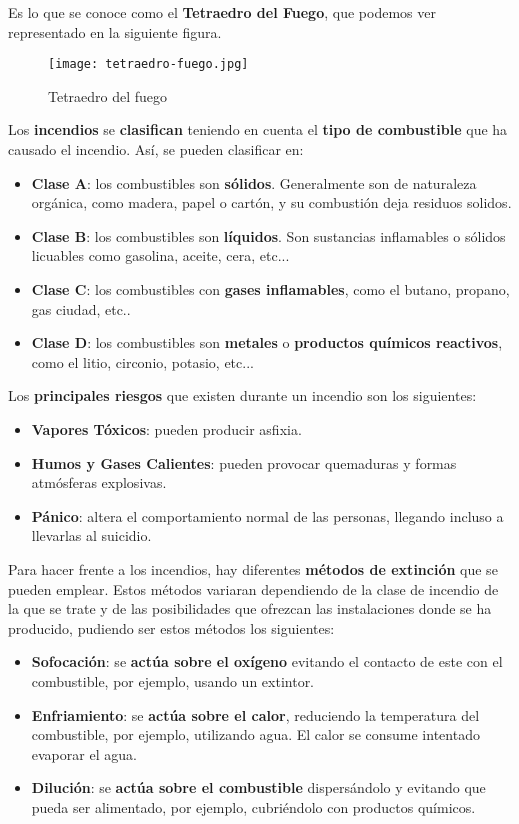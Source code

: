 Es lo que se conoce como el \textbf{Tetraedro del Fuego}, que podemos ver representado en la siguiente figura.

\begin{figure}[H]
    \centering
    \texttt{[image: tetraedro-fuego.jpg]}
    \caption{Tetraedro del fuego}
\end{figure}

Los \textbf{incendios} se \textbf{clasifican} teniendo en cuenta el \textbf{tipo de combustible} que ha causado el incendio. Así, se pueden clasificar en:

\begin{itemize}
    \item \textbf{Clase A}: los combustibles son \textbf{sólidos}. Generalmente son de naturaleza orgánica, como madera, papel o cartón, y su combustión deja residuos solidos.
    \item \textbf{Clase B}: los combustibles son \textbf{líquidos}. Son sustancias inflamables o sólidos licuables como gasolina, aceite, cera, etc...
    \item \textbf{Clase C}: los combustibles con \textbf{gases inflamables}, como el butano, propano, gas ciudad, etc..
    \item \textbf{Clase D}: los combustibles son \textbf{metales} o \textbf{productos químicos reactivos}, como el litio, circonio, potasio, etc...
\end{itemize}

Los \textbf{principales riesgos} que existen durante un incendio son los siguientes:

\begin{itemize}
    \item \textbf{Vapores Tóxicos}: pueden producir asfixia.
    \item \textbf{Humos y Gases Calientes}: pueden provocar quemaduras y formas atmósferas explosivas.
    \item \textbf{Pánico}: altera el comportamiento normal de las personas, llegando incluso a llevarlas al suicidio.
\end{itemize}

Para hacer frente a los incendios, hay diferentes \textbf{métodos de extinción} que se pueden emplear. Estos métodos variaran dependiendo de la clase de incendio de la que se trate y de las posibilidades que ofrezcan las instalaciones donde se ha producido, pudiendo ser estos métodos los siguientes:

\begin{itemize}
    \item \textbf{Sofocación}: se \textbf{actúa sobre el oxígeno} evitando el contacto de este con el combustible, por ejemplo, usando un extintor.
    \item \textbf{Enfriamiento}: se \textbf{actúa sobre el calor}, reduciendo la temperatura del combustible, por ejemplo, utilizando agua. El calor se consume intentado evaporar el agua.
    \item \textbf{Dilución}: se \textbf{actúa sobre el combustible} dispersándolo y evitando que pueda ser alimentado, por ejemplo, cubriéndolo con productos químicos.
\end{itemize}

